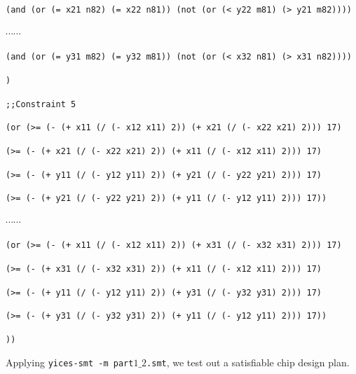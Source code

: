\documentclass[11pt]{article}
\begin{document}
{{\tt (and (or (= x21 n82) (= x22 n81)) (not (or (< y22 m81) (> y21 m82))))}

$\cdots \cdots$

{\tt (and (or (= y31 m82) (= y32 m81)) (not (or (< x32 n81) (> x31 n82))))}

{\tt )}

{\tt ;;Constraint 5}

{\tt (or (>= (- (+ x11 (/ (- x12 x11) 2)) (+ x21 (/ (- x22 x21) 2))) 17)}

{\tt (>= (- (+ x21 (/ (- x22 x21) 2)) (+ x11 (/ (- x12 x11) 2))) 17)}

{\tt (>= (- (+ y11 (/ (- y12 y11) 2)) (+ y21 (/ (- y22 y21) 2))) 17)}

{\tt (>= (- (+ y21 (/ (- y22 y21) 2)) (+ y11 (/ (- y12 y11) 2))) 17))}

$\cdots \cdots$

{\tt (or (>= (- (+ x11 (/ (- x12 x11) 2)) (+ x31 (/ (- x32 x31) 2))) 17)}

{\tt (>= (- (+ x31 (/ (- x32 x31) 2)) (+ x11 (/ (- x12 x11) 2))) 17)}

{\tt (>= (- (+ y11 (/ (- y12 y11) 2)) (+ y31 (/ (- y32 y31) 2))) 17)}

{\tt (>= (- (+ y31 (/ (- y32 y31) 2)) (+ y11 (/ (- y12 y11) 2))) 17))}

{\tt ))}
}

Applying {\tt yices-smt -m part$1\_2$.smt}, we test out a satisfiable chip design plan.
\end{document}
